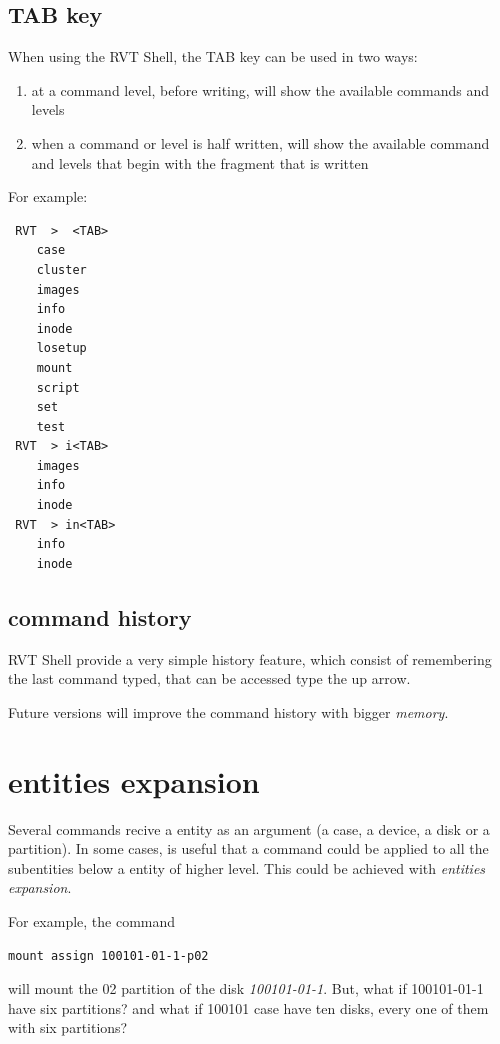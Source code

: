 \documentclass[a4paper,11pt,oneside]{report}
\begin{document}
\subsection{TAB key}

When using the RVT Shell, the TAB key can be used in two ways:

\begin{enumerate}
\item at a command level, before writing, will show the available commands and levels
\item when a command or level is half written, will show the available command and levels that begin with the fragment that is written
\end{enumerate}

For example:

\begin{verbatim}
 RVT  >  <TAB>	
	case
	cluster
	images
	info
	inode
	losetup
	mount
	script
	set
	test
 RVT  > i<TAB>	
	images
	info
	inode
 RVT  > in<TAB>	
	info
	inode
\end{verbatim}


\subsection{command history}

RVT Shell provide a very simple history feature, which consist of remembering the last command typed, that can be accessed type the up arrow.

Future versions will improve the command history with bigger \emph{memory}.






\section{entities expansion}

Several commands recive a entity as an argument (a case, a device, a disk or a partition).  In some cases, is useful that a command could be applied to all the subentities below a entity of higher level. This could be achieved with \emph{entities expansion}.

For example, the command 

\begin{verbatim}
mount assign 100101-01-1-p02
\end{verbatim}

 will mount the 02 partition of the disk \emph{100101-01-1}.  But, what if 100101-01-1 have six partitions? and what if 100101 case have ten disks, every one of them with six partitions?
\end{document}
